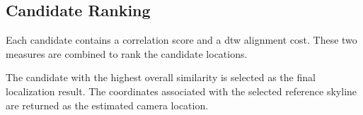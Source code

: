 \subsection{Candidate Ranking}

Each candidate contains a correlation score and a \gls{dtw} alignment cost. These two measures are combined to rank the candidate locations.

The candidate with the highest overall similarity is selected as the final localization result. The coordinates associated with the selected reference skyline are returned as the estimated camera location.








